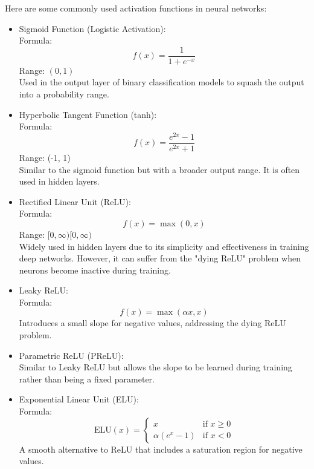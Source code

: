Here are some commonly used activation functions in neural networks:
\begin{itemize}
    \item Sigmoid Function (Logistic Activation):\\
        Formula: 
\begin{equation}
        f(x) = \frac{1}{1 + e^{-x}}
\end{equation}
        Range: $(0, 1)$\\
        Used in the output layer of binary classification models to squash the output into a probability range.
    \item 
        Hyperbolic Tangent Function (tanh):\\
        Formula: 
        \begin{equation}
        f(x) = \frac{e^{2x} - 1}{e^{2x} + 1}
        \end{equation}
        Range: (-1, 1)\\
        Similar to the sigmoid function but with a broader output range. It is often used in hidden layers.
    \item 
        Rectified Linear Unit (ReLU):\\
        Formula: 
        \begin{equation}
            f(x) = \max(0, x)
        \end{equation}
        Range: $[0,\infty)[0,\infty)$\\
        Widely used in hidden layers due to its simplicity and effectiveness in training deep networks. However, it can suffer from the "dying ReLU" problem when neurons become inactive during training.
    \item 
        Leaky ReLU:\\
        Formula: 
        \begin{equation}
            f(x) = \max(\alpha x, x)
            \label{eq:}
        \end{equation}
        Introduces a small slope for negative values, addressing the dying ReLU problem.

\item        Parametric ReLU (PReLU):\\
        Similar to Leaky ReLU but allows the slope to be learned during training rather than being a fixed parameter.

    \item Exponential Linear Unit (ELU):\\
        Formula:
\begin{equation}
\text{ELU}(x) =
\begin{cases}
    x & \text{if } x \geq 0 \\
    \alpha(e^x - 1) & \text{if } x < 0
\end{cases}
\end{equation}
       A smooth alternative to ReLU that includes a saturation region for negative values.


\end{itemize}
